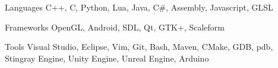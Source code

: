 


\begin{cvskills}


\cvskill
{Languages} %
{C++, C, Python, Lua, Java, C\#, Assembly, Javascript, GLSL } %

\cvskill
{Frameworks}
{OpenGL, Android, SDL, Qt, GTK+, Scaleform}

\cvskill
{Tools}
{Visual Studio, Eclipse, Vim, Git, Bash, Maven, CMake, GDB, pdb, Stingray Engine, Unity Engine, Unreal Engine, Arduino}



\end{cvskills}
